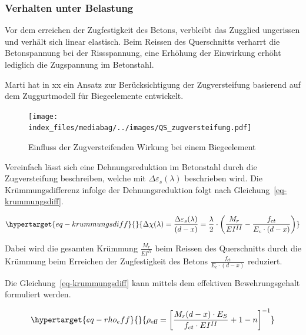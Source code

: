 \documentclass[
  letterpaper,
]{scrreprt}
\begin{document}
\hypertarget{verhalten-unter-belastung}{%
\subsubsection{Verhalten unter
Belastung}\label{verhalten-unter-belastung}}

Vor dem erreichen der Zugfestigkeit des Betons, verbleibt das Zugglied
ungerissen und verhält sich linear elastisch. Beim Reissen des
Querschnitts verharrt die Betonspannung bei der Rissspannung, eine
Erhöhung der Einwirkung erhöht lediglich die Zugspannung im Betonstahl.

Marti hat in xx ein Ansatz zur Berücksichtigung der Zugversteifung
basierend auf dem Zuggurtmodell für Biegeelemente entwickelt.

\begin{figure}[H]

{\centering \texttt{[image: index\_files/mediabag/../images/QS\_zugversteifung.pdf]}

}

\caption{\label{fig-einfluss_zugversteifung}Einfluss der
Zugversteifenden Wirkung bei einem Biegeelement}

\end{figure}

Vereinfach lässt sich eine Dehnungsreduktion im Betonstahl durch die
Zugversteifung beschreiben, welche mit
\(\Delta \varepsilon_s (\lambda)\) beschrieben wird. Die
Krümmungsdifferenz infolge der Dehnungsreduktion folgt nach
Gleichung~\ref{eq-krummungsdiff}.

\begin{equation}\protect\hypertarget{eq-krummungsdiff}{}{
\Delta \chi(\lambda) = \frac{\Delta \varepsilon_s (\lambda)}{(d-x)} = \frac{\lambda}{2} \cdot \left ( \frac{M_r}{EI^{II}} - \frac{f_{ct}}{E_c\cdot(d-x)}\right )
}\label{eq-krummungsdiff}\end{equation}

Dabei wird die gesamten Krümmung \(\frac{M_r}{EI^{II}}\) beim Reissen
des Querschnitts durch die Krümmung beim Erreichen der Zugfestigkeit des
Betons \(\frac{f_{ct}}{E_c\cdot(d-x)}\) reduziert.

Die Gleichung~\ref{eq-krummungsdiff} kann mittels dem effektiven
Bewehrungsgehalt formuliert werden.

\begin{equation}\protect\hypertarget{eq-rho_eff}{}{
\rho_{\text{eff}} = \left [\frac{M_r(d-x)\cdot E_S}{f_{ct}\cdot EI^{II}}+1-n \right ]^{-1}
}\label{eq-rho_eff}\end{equation}
\end{document}
